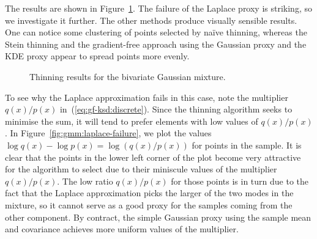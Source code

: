 \documentclass[11pt,a4paper]{report}
\begin{document}
The results are shown in Figure~\ref{fig:gmm:thinned}. The failure of the Laplace proxy is striking, so we investigate it further. The other methods produce visually sensible results. One can notice some clustering of points selected by na\"ive thinning, whereas the Stein thinning and the gradient-free approach using the Gaussian proxy and the KDE proxy appear to spread points more evenly.

\begin{figure}[h]
\centering
{}
\caption{Thinning results for the bivariate Gaussian mixture.
\label{fig:gmm:thinned}}
\end{figure}

To see why the Laplace approximation fails in this case, note the multiplier $q(x) / p(x)$ in~(\ref{eq:gf-ksd:discrete}). Since the thinning algorithm seeks to minimise the sum, it will tend to prefer elements with low values of $q(x) / p(x)$. In Figure~\ref{fig:gmm:laplace-failure}, we plot the values $\log q(x) - \log p(x) = \log (q(x) / p(x))$ for points in the sample. It is clear that the points in the lower left corner of the plot become very attractive for the algorithm to select due to their miniscule values of the multiplier $q(x) / p(x)$. The low ratio $q(x) / p(x)$ for those points is in turn due to the fact that the Laplace approximation picks the larger of the two modes in the mixture, so it cannot serve as a good proxy for the samples coming from the other component. By contract, the simple Gaussian proxy using the sample mean and covariance achieves more uniform values of the multiplier.
\end{document}
